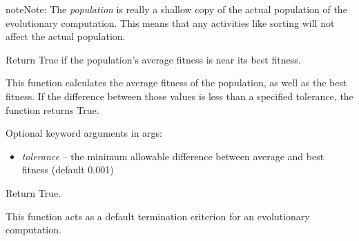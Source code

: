 \documentclass[letterpaper,10pt,english]{sphinxmanual}
\begin{document}
\begin{notice}{note}{Note:}
The \emph{population} is really a shallow copy of the actual population of
the evolutionary computation. This means that any activities like
sorting will not affect the actual population.
\end{notice}
\label{reference:module-terminators}

\begin{fulllineitems}
\label{reference:inspyred.ec.terminators.average_fitness_termination}
Return True if the population's average fitness is near its best fitness.

This function calculates the average fitness of the population, as well
as the best fitness. If the difference between those values is less 
than a specified tolerance, the function returns True.

Optional keyword arguments in args:
\begin{itemize}
\item {} 
\emph{tolerance} -- the minimum allowable difference between average 
and best fitness (default 0.001)

\end{itemize}

\end{fulllineitems}


\begin{fulllineitems}
\label{reference:inspyred.ec.terminators.default_termination}
Return True.

This function acts as a default termination criterion for an evolutionary computation.

\end{fulllineitems}

\end{document}
